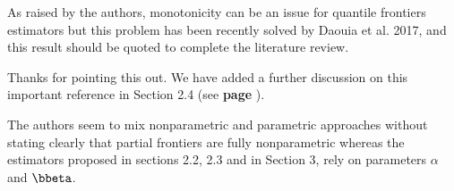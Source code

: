 \documentclass[12pt]{article}
\newcommand{\np}{\vskip 0.3cm}
\begin{document}

\np
\np
\np
\begin{sf}
{\blueb As raised by the authors, monotonicity can be an issue for quantile frontiers estimators but this problem has been recently solved by Daouia et al. 2017, and this result should be quoted to complete the literature review.}
\end{sf}
\begin{response}
Thanks for pointing this out. We have added a further discussion on this important reference in Section 2.4 (see \textbf{page }).

\end{response}



\np
\np
\np
\begin{sf}
{\blueb The authors seem to mix nonparametric and parametric approaches without stating clearly that partial frontiers are fully nonparametric whereas the estimators proposed in sections 2.2, 2.3 and in Section 3, rely on parameters $\alpha$ and $\bbeta$. }
\end{sf}
\end{document}
